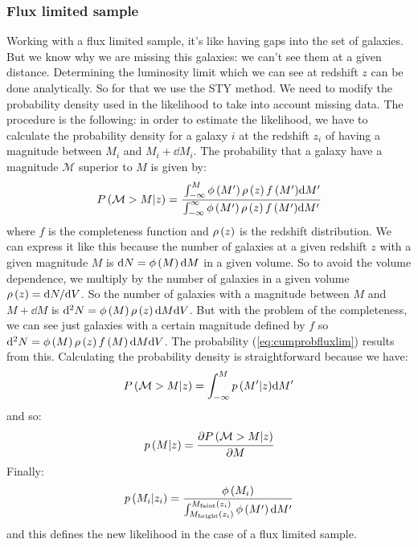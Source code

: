 \subsubsection{Flux limited sample}
%
Working with a flux limited sample, it's like having gaps into the set of
galaxies. But we know why we are missing this galaxies: we can't see them at a
given distance. Determining the luminosity limit which we can see at redshift
$z$ can be done analytically. So for that we use the STY method. We need to modify the probability
density used in the likelihood to take into account missing data. The procedure
is the following: in order to estimate the likelihood, we have to calculate the
probability density for a galaxy $i$ at the redshift $z_i$ of having a
magnitude between $M_i$ and $M_i+\dd{M_i}$. The probability that a galaxy have
a magnitude $\mathcal{M}$ superior to $M$ is given by:
%
\begin{equation}\label{eq:cumprobfluxlim}
    P\left(\mathcal{M}>M|z\right)=\cfrac{\int_{-\infty}^M{\phi\left({M'}\right)\rho\left({z}\right){f\left({M'}\right)}{\rm{d}}{M'}}}
    {\int_{-\infty}^{\infty}{\phi\left({M'}\right)\rho\left({z}\right){f\left({M'}\right)}{\rm{d}}{M'}}}
\end{equation}
%
where $f$ is the completeness function and $\rho\left({z}\right)$ is the redshift
distribution. We can express it like this because the number of galaxies at a
given redshift $z$ with a given magnitude $M$ is ${\rm{d}}{N}=\phi\left({M}\right){\rm{d}}{M}$
in a given volume. So to avoid the volume dependence, we multiply by the number
of galaxies in a given volume $\rho\left({z}\right)={\rm{d}}{N}/{\rm{d}}{V}$. So the number of
galaxies with a magnitude between $M$ and $M+\dd{M}$ is
${\rm{d}}^2{N}=\phi\left({M}\right)\rho\left({z}\right){\rm{d}}{M}{\rm{d}}{V}$. But with the problem of the
completeness, we can see just galaxies with a certain magnitude defined by $f$
so ${\rm{d}}^2{N}=\phi\left({M}\right)\rho\left({z}\right) f\left({M}\right){\rm{d}}{M}{\rm{d}}{V}$. The
probability (\ref{eq:cumprobfluxlim}) results from this. Calculating the
probability density is straightforward because we have:
%
\begin{equation}
    P\left(\mathcal{M}>M|z\right)=\int_{-\infty}^M{p\left({M'|z}\right)}{\rm{d}}{M'}
\end{equation}
%
and so:
%
\begin{equation}
    p\left({M|z}\right)=\cfrac{{\partial} P\left(\mathcal{M}>M|z\right)}{{\partial} M}
\end{equation}
%
Finally:
%
\begin{equation}
    p\left({M_i|z_i}\right)=\dfrac{\phi\left({M_i}\right)}{\int_{M_{\mathrm{bright}}\left({z_i}\right)}^{M_{\mathrm{faint}}\left({z_i}\right)}
    {\phi\left({M'}\right){\rm{d}}{M'}}}
\end{equation}
%
and this defines the new likelihood in the case of a flux limited sample.

